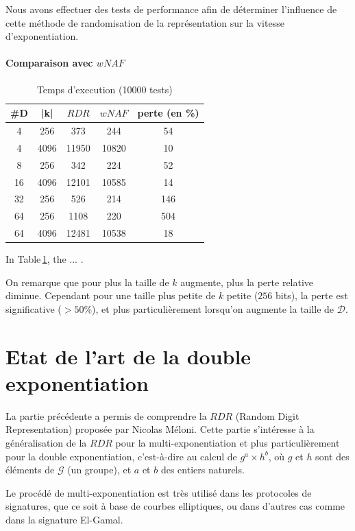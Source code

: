 \documentclass[12pt, a4paper]{memoir}
\begin{document}
Nous avons effectuer des tests de performance afin de déterminer l'influence de cette méthode de randomisation de la représentation sur la vitesse d'exponentiation.

\subsubsection{Comparaison avec $wNAF$}

\begin{table}[htbp]
\caption{Temps d'execution (10000 tests) }
\begin{center}
\begin{tabular}{ccccc}
\toprule
\#D & |k| & $RDR$ & $wNAF$ & perte (en \%) \\
\midrule
4 & 256 & 373  & 244 & 54\\
4 & 4096 & 11950 & 10820 & 10 \\
8 & 256 & 342 & 224 & 52 \\
16 & 4096 & 12101 & 10585 & 14 \\
32 & 256 & 526 & 214 & 146 \\
64 & 256 & 1108 & 220 & 504 \\
64 & 4096 & 12481 & 10538 & 18 \\
\bottomrule
\end{tabular}
\end{center}
\label{tab:example}
\end{table}%

In Table\,\ref{tab:example}, the ... \cite{ex}.

On remarque que pour plus la taille de $k$ augmente, plus la perte relative diminue.
Cependant pour une taille plus petite de $k$ petite ($256$ bits), la perte est significative ($> 50 \%$),
et plus particulièrement lorsqu'on augmente la taille de $\mathcal{D}$.

\chapter{Etat de l'art de la double exponentiation}

La partie précédente a permis de comprendre la $RDR$ (Random Digit Representation) proposée par Nicolas Méloni.
Cette partie s'intéresse à la généralisation de la $RDR$ pour la multi-exponentiation et plus particulièrement
pour la double exponentiation, c'est-à-dire au calcul de $g^a \times h^b$, où $g$ et $h$ sont des 
éléments de $\mathcal{G}$ (un groupe), et $a$ et $b$ des entiers naturels.

Le procédé de multi-exponentiation est très utilisé dans les protocoles de signatures, que ce soit à base 
de courbes elliptiques, ou dans d'autres cas comme dans la signature El-Gamal.
\end{document}
